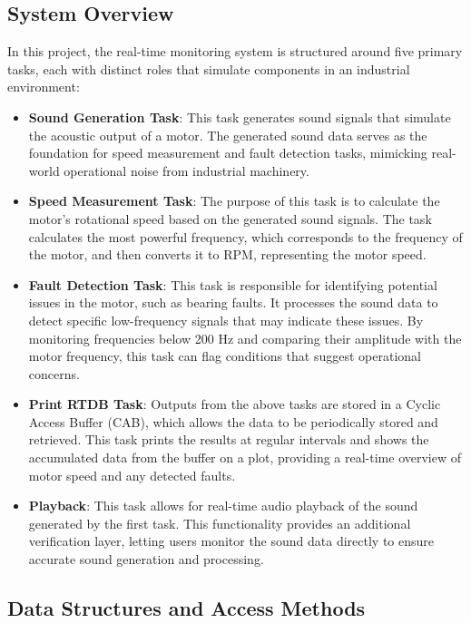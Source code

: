 \documentclass[a4paper,12pt]{article}
\begin{document}
\subsection{System Overview}
In this project, the real-time monitoring system is structured around five primary tasks, each with distinct roles that simulate components in an industrial environment:
\begin{itemize}
    \item \textbf{Sound Generation Task}: This task generates sound signals that simulate the acoustic output of a motor. The generated sound data serves as the foundation for speed measurement and fault detection tasks, mimicking real-world operational noise from industrial machinery.

    \item \textbf{Speed Measurement Task}: The purpose of this task is to calculate the motor’s rotational speed based on the generated sound signals. The task calculates the most powerful frequency, which corresponds to the frequency of the motor, and then converts it to RPM, representing the motor speed.

    \item \textbf{Fault Detection Task}: This task is responsible for identifying potential issues in the motor, such as bearing faults. It processes the sound data to detect specific low-frequency signals that may indicate these issues. By monitoring frequencies below 200 Hz and comparing their amplitude with the motor frequency, this task can flag conditions that suggest operational concerns.

    \item \textbf{Print RTDB Task}: Outputs from the above tasks are stored in a Cyclic Access Buffer (CAB), which allows the data to be periodically stored and retrieved. This task prints the results at regular intervals and shows the accumulated data from the buffer on a plot, providing a real-time overview of motor speed and any detected faults. 

    \item \textbf{Playback}: This task allows for real-time audio playback of the sound generated by the first task. This functionality provides an additional verification layer, letting users monitor the sound data directly to ensure accurate sound generation and processing.
\end{itemize}

\subsection{Data Structures and Access Methods}
\end{document}
